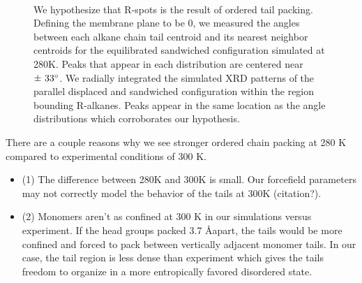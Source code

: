 \documentclass{article}
\begin{document}
\begin{figure}[!htb]
\begin{subfigure}{\linewidth}
\begin{subfigure}{0.45\textwidth}
		\end{subfigure}
	\end{subfigure} 
    \caption{We hypothesize that R-spots is the result of ordered tail packing.
	  Defining the membrane plane to be 0\degree, we measured the angles between each
	  alkane chain tail centroid and its nearest neighbor centroids for the
	  equilibrated sandwiched configuration simulated at 280K. Peaks
	  that appear in each distribution are centered near $\pm~33\degree$. We radially
	  integrated the simulated XRD patterns of the parallel displaced and sandwiched
	  configuration within the region bounding R-alkanes.
	  Peaks appear in the same location as the angle distributions which corroborates
	  our hypothesis.}~\label{fig:tail_packing}
  \end{figure}  
  
  There are a couple reasons why we see stronger ordered chain packing at 280 K compared to
  experimental conditions of 300 K.
  \begin{itemize}
  		\item (1) The difference between 280K and 300K is small. Our forcefield parameters
  		may not correctly model the behavior of the tails at 300K (citation?).
  		\item (2) Monomers aren't as confined at 300 K in our simulations versus experiment.
  		If the head groups packed 3.7 \AA apart, the tails would be more confined and forced
  		to pack between vertically adjacent monomer tails. In our case, the tail region is
  		less dense than experiment which gives the tails freedom to organize in a more
  		entropically favored disordered state. 
  \end{itemize}
\end{document}
